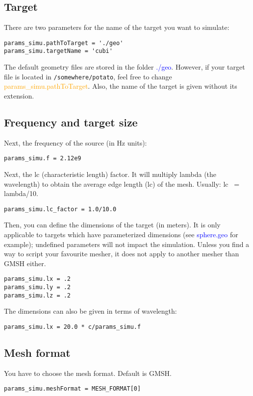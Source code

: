 \documentclass[a4paper,10pt]{book}
\newcommand{\file}[1] {\textcolor{blue}{\textsf{#1}}}
\newcommand{\parameter}[1] {\textcolor{orange}{\textsf{#1}}}
\begin{document}
\subsection{Target}
%
\par
There are two parameters for the name of the target you want to simulate:
\begin{verbatim}
params_simu.pathToTarget = './geo'
params_simu.targetName = 'cubi'
\end{verbatim}
The default geometry files are stored in the folder \file{./geo}. However, if your target file is located in \texttt{/somewhere/potato}, feel free to change \parameter{params\_simu.pathToTarget}. Also, the name of the target is given without its extension.

\subsection{Frequency and target size}
%
\par
Next, the frequency of the source (in Hz units):
\begin{verbatim}
params_simu.f = 2.12e9
\end{verbatim}
%
\par
Next, the lc (characteristic length) factor. It will multiply lambda (the wavelength) to obtain the average edge length (lc) of the mesh. Usually: lc ~= lambda/10.
\begin{verbatim}
params_simu.lc_factor = 1.0/10.0
\end{verbatim}
%
\par
Then, you can define the dimensions of the target (in meters). It is only applicable to targets which have parameterized dimensions (see \file{sphere.geo} for example); undefined parameters will not impact the simulation. Unless you find a way to script your favourite mesher, it does not apply to another mesher than GMSH either.
\begin{verbatim}
params_simu.lx = .2
params_simu.ly = .2
params_simu.lz = .2
\end{verbatim}
The dimensions can also be given in terms of wavelength:
\begin{verbatim}
params_simu.lx = 20.0 * c/params_simu.f
\end{verbatim}

\subsection{Mesh format}
%
\par
You have to choose the mesh format. Default is GMSH.
\begin{verbatim}
params_simu.meshFormat = MESH_FORMAT[0]
\end{verbatim}
\end{document}
